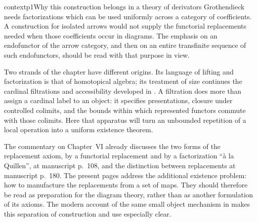 
\begin{dcomment}{context}{p1}{Why this construction belongs in a theory of derivators}
Grothendieck needs factorizations which can be used uniformly across a category of coefficients. A construction for isolated arrows would not supply the functorial replacements needed when those coefficients occur in diagrams. The emphasis on an endofunctor of the arrow category, and then on an entire transfinite sequence of such endofunctors, should be read with that purpose in view.

Two strands of the chapter have different origins. Its language of lifting and factorization is that of homotopical algebra; its treatment of size continues the cardinal filtrations and accessibility developed in \citep[Expos\'e~I, \S9]{SGA4I1972}. A filtration does more than assign a cardinal label to an object: it specifies presentations, closure under controlled colimits, and the bounds within which represented functors commute with those colimits. Here that apparatus will turn an unbounded repetition of a local operation into a uniform existence theorem.

The commentary on Chapter~VI already discusses the two forms of the replacement axiom, by a functorial replacement and by a factorization ``à la Quillen'', at manuscript p.~108, and the distinction between replacements at manuscript p.~180. The present pages address the additional existence problem: how to manufacture the replacements from a set of maps. They should therefore be read as preparation for the diagram theory, rather than as another formulation of its axioms. The modern account of the same small object mechanism in \citep[Chapter~12]{Riehl2014} makes this separation of construction and use especially clear.
\end{dcomment}

